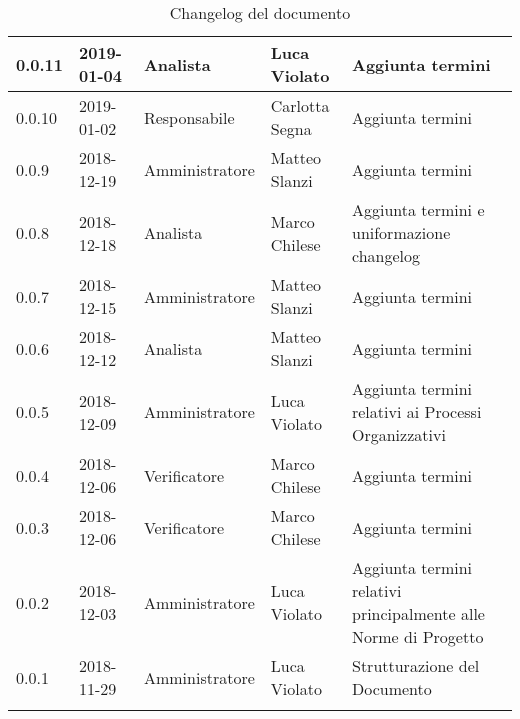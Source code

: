 \begin{center}
\begin{longtable}[c]{|m{}|m{}|m{}|m{}|p{}|}
\hline
0.0.11 & 2019-01-04 & Analista & Luca Violato & Aggiunta termini\\
\hline
\rowcolor{grigio} 0.0.10 & 2019-01-02 & Responsabile & Carlotta Segna & Aggiunta termini\\
\hline
0.0.9 & 2018-12-19 & Amministratore & Matteo Slanzi & Aggiunta termini\\
\hline
\rowcolor{grigio}0.0.8 & 2018-12-18 & Analista & Marco Chilese & Aggiunta termini e uniformazione changelog\\
\hline
0.0.7 & 2018-12-15 & Amministratore & Matteo Slanzi & Aggiunta termini\\
\hline
\rowcolor{grigio}0.0.6 & 2018-12-12 & Analista & Matteo Slanzi & Aggiunta termini\\
\hline
0.0.5 & 2018-12-09 & Amministratore & Luca Violato & Aggiunta termini relativi ai Processi Organizzativi\\
\hline
\rowcolor{grigio}0.0.4 & 2018-12-06 & Verificatore & Marco Chilese & Aggiunta termini\\
\hline 
0.0.3 & 2018-12-06 & Verificatore  & Marco Chilese & Aggiunta termini\\
\hline
\rowcolor{grigio}0.0.2 & 2018-12-03 & Amministratore & Luca Violato & Aggiunta termini relativi principalmente alle Norme di Progetto \\
\hline
0.0.1 & 2018-11-29  & Amministratore & Luca Violato & Strutturazione del Documento \\
\hline
\caption{Changelog del documento}
\end{longtable}
\end{center}